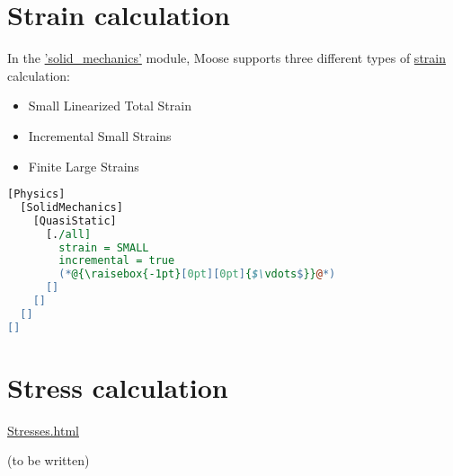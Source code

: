 \section{Strain calculation}
\label{chap:setup-strain}

In the
\href{https://mooseframework.inl.gov/modules/solid_mechanics/}{'solid\_mechanics'}
module, Moose supports three different types of
\href{https://mooseframework.inl.gov/modules/solid_mechanics/Strains.html}{strain}
calculation:
\begin{itemize}
  \item {Small Linearized Total Strain}
  \item {Incremental Small Strains}
  \item {Finite Large Strains}
\end{itemize}

\begin{lstlisting}[language=perl, caption={Setting up incremental small strains within the Physics/SolidMechanics block},label={setup-incremental-small-strains}]
[Physics]
  [SolidMechanics]
    [QuasiStatic]
      [./all]
        strain = SMALL
        incremental = true
        (*@{\raisebox{-1pt}[0pt][0pt]{$\vdots$}}@*)
      []
    []
  []
[]
\end{lstlisting}

\section{Stress calculation}
\label{chap:setup-stress}

\href{https://mooseframework.inl.gov/modules/solid_mechanics/Stresses.html}{Stresses.html}

(to be written)